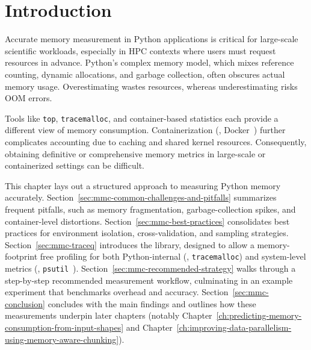 \section{Introduction}
\label{sec:mmc-introduction}

Accurate memory measurement in Python applications is critical for large-scale scientific workloads, especially in \ac{HPC} contexts where users must request resources in advance.
Python's complex memory model, which mixes reference counting, dynamic allocations, and garbage collection, often obscures actual memory usage.
Overestimating wastes resources, whereas underestimating risks \ac{OOM} errors.

Tools like \texttt{top}\cite{top_linux_manpage}, \texttt{tracemalloc}\cite{tracemalloc}, and container-based statistics each provide a different view of memory consumption.
Containerization (\eg, Docker~\cite{docker}) further complicates accounting due to caching and shared kernel resources.
Consequently, obtaining definitive or comprehensive memory metrics in large-scale or containerized settings can be difficult.

This chapter lays out a structured approach to measuring Python memory accurately.
Section~\ref{sec:mmc-common-challenges-and-pitfalls} summarizes frequent pitfalls, such as memory fragmentation, garbage-collection spikes, and container-level distortions.
Section~\ref{sec:mmc-best-practices} consolidates best practices for environment isolation, cross-validation, and sampling strategies.
Section~\ref{sec:mmc-traceq} introduces the \traceq library, designed to allow a memory-footprint free profiling for both Python-internal (\eg, \texttt{tracemalloc}) and system-level metrics (\eg, \texttt{psutil}~\cite{psutil}).
Section~\ref{sec:mmc-recommended-strategy} walks through a step-by-step recommended measurement workflow, culminating in an example experiment that benchmarks overhead and accuracy.
Section~\ref{sec:mmc-conclusion} concludes with the main findings and outlines how these measurements underpin later chapters (notably Chapter~\ref{ch:predicting-memory-consumption-from-input-shapes} and Chapter~\ref{ch:improving-data-parallelism-using-memory-aware-chunking}).